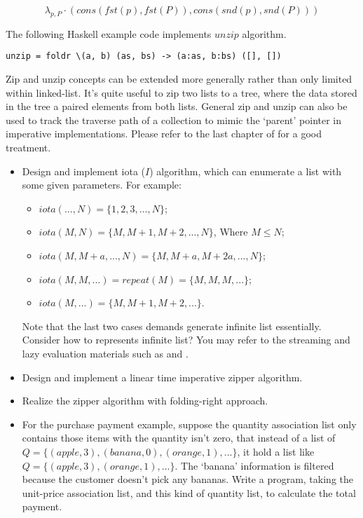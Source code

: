 \documentclass{article}
\begin{document}
\[
\lambda_{p, P} \cdot (cons(fst(p), fst(P)), cons(snd(p), snd(P)))
\]

The following Haskell example code implements $unzip$ algorithm.

\lstset{language=Haskell}
\begin{lstlisting}
unzip = foldr \(a, b) (as, bs) -> (a:as, b:bs) ([], [])
\end{lstlisting}

Zip and unzip concepts can be extended more generally rather than only limited within linked-list. It's quite
useful to zip two lists to a tree, where the data stored in the tree a paired elements from both lists.
General zip and unzip can also be used to track the traverse path of a collection to mimic the `parent' pointer
in imperative implementations. Please refer to the last chapter of \cite{learn-haskell} for a good treatment.

\begin{Exercise}
\begin{itemize}
\item Design and implement iota ($I$) algorithm, which can enumerate a list with some given parameters. For example:
  \begin{itemize}
  \item $iota(..., N) = \{1, 2, 3, ..., N\}$;
  \item $iota(M, N) = \{M, M+1, M+2, ..., N\}$, Where $M \leq N$;
  \item $iota(M, M+a, ..., N) = \{M, M+a, M+2a, ..., N \}$;
  \item $iota(M, M, ...) = repeat(M) = \{M, M, M, ...\}$;
  \item $iota(M, ...) = \{M, M+1, M+2, ... \}$.
  \end{itemize}
  Note that the last two cases demands generate infinite list essentially. Consider how to represents infinite list?
  You may refer to the streaming and lazy evaluation materials such as \cite{SICP} and \cite{learn-haskell}.
\item Design and implement a linear time imperative zipper algorithm.
\item Realize the zipper algorithm with folding-right approach.
\item For the purchase payment example, suppose the quantity association list only contains those items with
the quantity isn't zero, that instead of a list of $Q = \{(apple, 3), (banana, 0), (orange, 1), ...\}$, it
hold a list like $Q = \{(apple, 3), (orange, 1), ...\}$. The `banana' information is filtered because the customer
doesn't pick any bananas. Write a program, taking the unit-price association list, and this kind of quantity
list, to calculate the total payment.
\end{itemize}
\end{Exercise}
\end{document}
